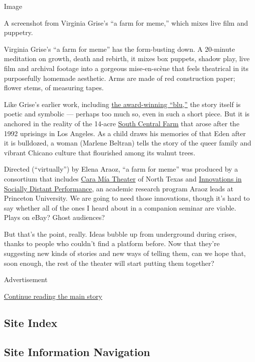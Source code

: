 Image

A screenshot from Virginia Grise's ``a farm for meme,'' which mixes live
film and puppetry.

Virginia Grise's ``a farm for meme'' has the form-busting down. A
20-minute meditation on growth, death and rebirth, it mixes box puppets,
shadow play, live film and archival footage into a gorgeous
mise-en-scène that feels theatrical in its purposefully homemade
aesthetic. Arms are made of red construction paper; flower stems, of
measuring tapes.

Like Grise's earlier work, including
\href{https://artsbeat.blogs.nytimes.com/2010/02/23/yale-drama-series-prize-awarded/}{the
award-winning ``blu,''} the story itself is poetic and symbolic ---
perhaps too much so, even in such a short piece. But it is anchored in
the reality of the 14-acre
\href{https://www.southcentralfarm.org/about-us}{South Central Farm}
that arose after the 1992 uprisings in Los Angeles. As a child draws his
memories of that Eden after it is bulldozed, a woman (Marlene Beltran)
tells the story of the queer family and vibrant Chicano culture that
flourished among its walnut trees.

Directed (``virtually'') by Elena Araoz, ``a farm for meme'' was
produced by a consortium that includes
\href{https://www.caramiatheatre.org/}{Cara Mía Theater} of North Texas
and \href{https://www.sociallydistantperformance.com/}{Innovations in
Socially Distant Performance}, an academic research program Araoz leads
at Princeton University. We are going to need those innovations, though
it's hard to say whether all of the ones I heard about in a companion
seminar are viable. Plays on eBay? Ghost audiences?

But that's the point, really. Ideas bubble up from underground during
crises, thanks to people who couldn't find a platform before. Now that
they're suggesting new kinds of stories and new ways of telling them,
can we hope that, soon enough, the rest of the theater will start
putting them together?

Advertisement

\protect\hyperlink{after-bottom}{Continue reading the main story}

\hypertarget{site-index}{%
\subsection{Site Index}\label{site-index}}

\hypertarget{site-information-navigation}{%
\subsection{Site Information
Navigation}\label{site-information-navigation}}

